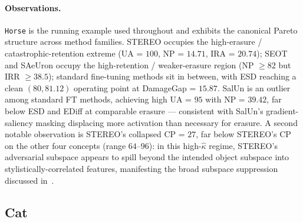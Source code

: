 \paragraph{Observations.}
\texttt{Horse} is the running example used throughout  and exhibits the canonical Pareto structure across method families. STEREO occupies the high-erasure / catastrophic-retention extreme (UA = $100$, NP = $14.71$, IRA = $20.74$); SEOT and SAeUron occupy the high-retention / weaker-erasure region (NP $\geq 82$ but IRR $\geq 38.5$); standard fine-tuning methods sit in between, with ESD reaching a clean $(80, 81.12)$ operating point at DamageGap = $15.87$. SalUn is an outlier among standard FT methods, achieving high UA = $95$ with NP = $39.42$, far below ESD and EDiff at comparable erasure --- consistent with SalUn's gradient-saliency masking displacing more activation than necessary for erasure. A second notable observation is STEREO's collapsed CP = $27$, far below STEREO's CP on the other four concepts (range $64$--$96$): in this high-$\hat\kappa$ regime, STEREO's adversarial subspace appears to spill beyond the intended object subspace into stylistically-correlated features, manifesting the broad subspace suppression discussed in~.
\subsection{Cat}
\label{app:per_concept_cat}

